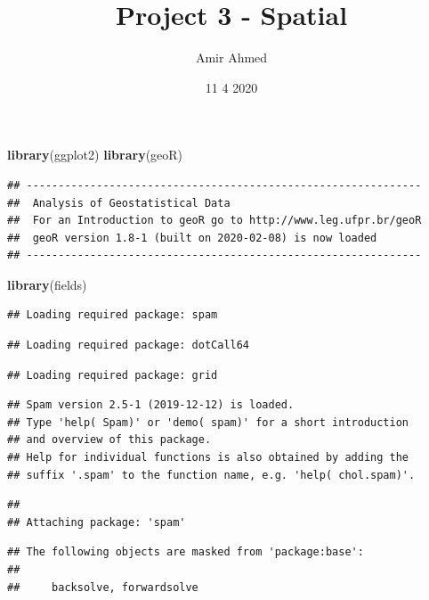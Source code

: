 \documentclass[
]{article}
\title{Project 3 - Spatial}
\author{Amir Ahmed}
\date{11 4 2020}
\newenvironment{Shaded}{\begin{snugshade}}{\end{snugshade}}
\newcommand{\KeywordTok}[1]{\textcolor[rgb]{0.13,0.29,0.53}{\textbf{#1}}}
\newcommand{\NormalTok}[1]{#1}
\begin{document}
\maketitle

\begin{Shaded}
\begin{Highlighting}[]
\KeywordTok{library}\NormalTok{(ggplot2)}
\KeywordTok{library}\NormalTok{(geoR)}
\end{Highlighting}
\end{Shaded}

\begin{verbatim}
## --------------------------------------------------------------
##  Analysis of Geostatistical Data
##  For an Introduction to geoR go to http://www.leg.ufpr.br/geoR
##  geoR version 1.8-1 (built on 2020-02-08) is now loaded
## --------------------------------------------------------------
\end{verbatim}

\begin{Shaded}
\begin{Highlighting}[]
\KeywordTok{library}\NormalTok{(fields)}
\end{Highlighting}
\end{Shaded}

\begin{verbatim}
## Loading required package: spam
\end{verbatim}

\begin{verbatim}
## Loading required package: dotCall64
\end{verbatim}

\begin{verbatim}
## Loading required package: grid
\end{verbatim}

\begin{verbatim}
## Spam version 2.5-1 (2019-12-12) is loaded.
## Type 'help( Spam)' or 'demo( spam)' for a short introduction 
## and overview of this package.
## Help for individual functions is also obtained by adding the
## suffix '.spam' to the function name, e.g. 'help( chol.spam)'.
\end{verbatim}

\begin{verbatim}
## 
## Attaching package: 'spam'
\end{verbatim}

\begin{verbatim}
## The following objects are masked from 'package:base':
## 
##     backsolve, forwardsolve
\end{verbatim}
\end{document}
